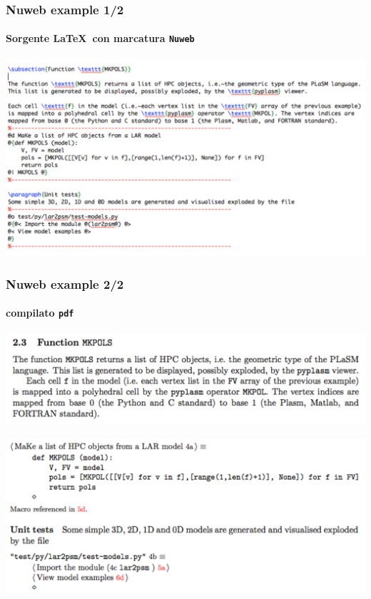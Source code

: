 \documentclass{beamer}
\begin{document}
{
  \frametitle{Nuweb example 1/2}
  \framesubtitle{Sorgente \LaTeX\ con marcatura \texttt{Nuweb}}

   \centering
   \includegraphics[width=\linewidth]{figs/nuweb1} 

}
\frame
{
  \frametitle{Nuweb example 2/2}
  \framesubtitle{compilato \texttt{pdf}}

   \centering
   \includegraphics[width=0.8\linewidth]{figs/nuweb2} 
   
   \includegraphics[width=0.8\linewidth]{figs/nuweb3} 

}
\end{document}
